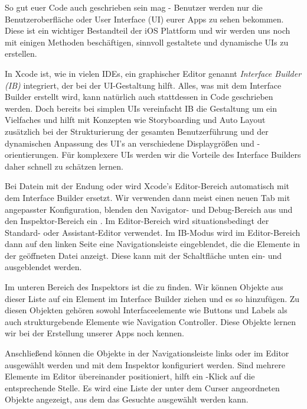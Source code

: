 \documentclass[parskip=half, final]{scrreprt}
\begin{document}
So gut euer Code auch geschrieben sein mag - Benutzer werden nur die Benutzeroberfläche oder User Interface (UI) eurer Apps zu sehen bekommen. Diese ist ein wichtiger Bestandteil der iOS Plattform und wir werden uns noch mit einigen Methoden beschäftigen, sinnvoll gestaltete und dynamische UIs zu erstellen.

In Xcode ist, wie in vielen IDEs, ein graphischer Editor genannt \emph{Interface Builder (IB)} integriert, der bei der UI-Gestaltung hilft. Alles, was mit dem Interface Builder erstellt wird, kann natürlich auch stattdessen in Code geschrieben werden. Doch bereits bei simplen UIs vereinfacht IB die Gestaltung um ein Vielfaches und hilft mit Konzepten wie Storyboarding und Auto Layout zusätzlich bei der Strukturierung der gesamten Benutzerführung und der dynamischen Anpassung des UI's an verschiedene Displaygrößen und -orientierungen. Für komplexere UIs werden wir die Vorteile des Interface Builders daher schnell zu schätzen lernen.

Bei Datein mit der Endung  oder  wird Xcode's Editor-Bereich automatisch mit dem Interface Builder ersetzt. Wir verwenden dann meist einen neuen Tab mit angepasster Konfiguration, blenden den Navigator- und Debug-Bereich aus und den Inspektor-Bereich ein . Im Editor-Bereich wird situationsbedingt der Standard- oder Assistant-Editor verwendet. Im IB-Modus wird im Editor-Bereich dann auf den linken Seite eine Navigationsleiste eingeblendet, die die Elemente in der geöffneten Datei anzeigt. Diese kann mit der Schaltfläche unten ein- und ausgeblendet werden.


Im unteren Bereich des Inspektors ist die  zu finden. Wir können Objekte aus dieser Liste auf ein Element im Interface Builder ziehen und es so hinzufügen. Zu diesen Objekten gehören sowohl Interfaceelemente wie Buttons und Labels als auch strukturgebende Elemente wie Navigation Controller. Diese Objekte lernen wir bei der Erstellung unserer Apps noch kennen.

Anschließend können die Objekte in der Navigationsleiste links oder im Editor ausgewählt werden und mit dem Inspektor konfiguriert werden. Sind mehrere Elemente im Editor übereinander positioniert, hilft ein \keys{\shift}-Klick auf die entsprechende Stelle. Es wird eine Liste der unter dem Curser angeordneten Objekte angezeigt, aus dem das Gesuchte ausgewählt werden kann. 
\end{document}
